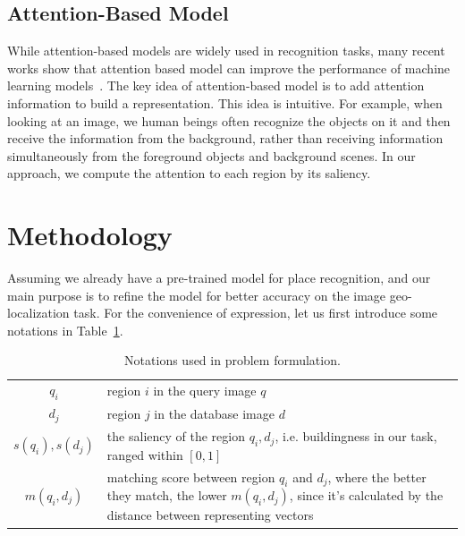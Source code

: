 \subsection{Attention-Based Model}
While attention-based models are widely used in recognition tasks, many recent works show that attention based model can improve the performance of machine learning models~\cite{mnih2014recurrent, zheng2015neural}. The key idea of attention-based model is to add attention information to build a representation. This idea is intuitive. For example, when looking at an image, we human beings often recognize the objects on it and then receive the information from the background, rather than receiving information simultaneously from the foreground objects and background scenes. In our approach, we compute the attention to each region by its saliency. 



\section{Methodology}
Assuming we already have a pre-trained model for place recognition, and our main purpose is to refine the model for better accuracy on the image geo-localization task. For the convenience of expression, let us first introduce some notations in Table~\ref{table:notations}. 
\begin{table}
\begin{center}
\begin{tabular}{|c|p{}|}
\hline
$q_i$ & region $i$ in the query image $q$\\[0.2cm]
$d_j$ & region $j$ in the database image $d$\\[0.2cm]
$s(q_i), s(d_j)$ & the saliency of the region $q_i, d_j$, i.e. buildingness in our
task, ranged within $[0,1]$ \\[0.2cm]
$m(q_i, d_j)$ & matching score between region $q_i$ and $d_j$, where the better they match, the lower $m(q_i,d_j)$, since it's calculated by the distance between representing vectors\\[0.2cm]
\hline
\end{tabular}
\end{center}
\caption{Notations used in problem formulation.}
\label{table:notations}
\end{table}
